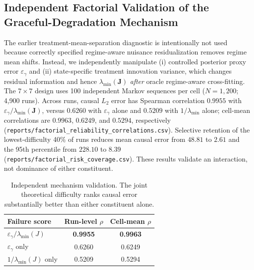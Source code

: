 \documentclass[twoside]{article}
\theoremstyle{definition}
\begin{document}
\subsection{Independent Factorial Validation of the Graceful-Degradation Mechanism}
\label{app:factorial_reliability}
The earlier treatment-mean-separation diagnostic is intentionally not used because correctly specified regime-aware nuisance residualization removes regime mean shifts. Instead, we independently manipulate (i) controlled posterior proxy error $\varepsilon_\gamma$ and (ii) state-specific treatment innovation variance, which changes residual information and hence $\lambda_{\min}(\boldsymbol J)$ \emph{after} oracle regime-aware cross-fitting. The $7\times7$ design uses 100 independent Markov sequences per cell ($N=1,200$; 4,900 runs). Across runs, causal $L_2$ error has Spearman correlation $0.9955$ with $\varepsilon_\gamma/\lambda_{\min}(\boldsymbol J)$, versus $0.6260$ with $\varepsilon_\gamma$ alone and $0.5209$ with $1/\lambda_{\min}$ alone; cell-mean correlations are $0.9963$, $0.6249$, and $0.5294$, respectively (\texttt{reports/factorial\_reliability\_correlations.csv}). Selective retention of the lowest-difficulty 40\% of runs reduces mean causal error from $48.81$ to $2.61$ and the 95th percentile from $228.10$ to $8.39$ (\texttt{reports/factorial\_risk\_coverage.csv}). These results validate an interaction, not dominance of either constituent.

\begin{table}[!ht]
\centering
\footnotesize
\renewcommand{\arraystretch}{0.72}
\caption{Independent mechanism validation. The joint theoretical difficulty ranks causal error substantially better than either constituent alone.}
\label{tab:factorial_validation}
\begin{tabular}{lcc}
\toprule
\textbf{Failure score} & \textbf{Run-level $\rho$} & \textbf{Cell-mean $\rho$}\\
\midrule
$\varepsilon_\gamma/\lambda_{\min}(J)$ & \textbf{0.9955} & \textbf{0.9963}\\
$\varepsilon_\gamma$ only & 0.6260 & 0.6249\\
$1/\lambda_{\min}(J)$ only & 0.5209 & 0.5294\\
\bottomrule
\end{tabular}
\end{table}
\end{document}
